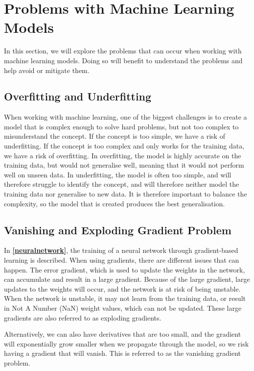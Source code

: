 \section{Problems with Machine Learning Models} \label{sec:problemsmachinelearning}
In this section, we will explore the problems that can occur when working with machine learning models. Doing so will benefit to understand the problems and help avoid or mitigate them.

\subsection{Overfitting and Underfitting}\label{sec:over_underfit}

When working with machine learning, one of the biggest challenges is to create a model that is complex enough to solve hard problems, but not too complex to misunderstand the concept. If the concept is too simple, we have a risk of underfitting. If the concept is too complex and only works for the training data, we have a risk of overfitting. In overfitting, the model is highly accurate on the training data, but would not generalise well, meaning that it would not perform well on unseen data. In underfitting, the model is often too simple, and will therefore struggle to identify the concept, and will therefore neither model the training data nor generalise to new data. It is therefore important to balance the complexity, so the model that is created produces the best generalisation.\cite{Hulten2018}

\subsection{Vanishing and Exploding Gradient Problem} \label{sec:vanishing_exploding_gradient_problem}

In \textbf{\autoref{neuralnetwork}}, the training of a neural network through gradient-based learning is described. When using gradients, there are different issues that can happen. The error gradient, which is used to update the weights in the network, can accumulate and result in a large gradient. Because of the large gradient, large updates to the weights will occur, and the network is at risk of being unstable. When the network is unstable, it may not learn from the training data, or result in Not A Number (NaN) weight values, which can not be updated. These large gradients are also referred to as exploding gradients.\cite{vanishingexploding}

Alternatively, we can also have derivatives that are too small, and the gradient will exponentially grow smaller when we propagate through the model, so we risk having a gradient that will vanish. This is referred to as the vanishing gradient problem.\cite{vanishingexploding}